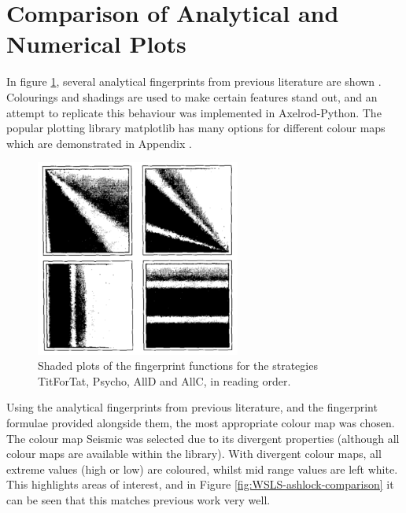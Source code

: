 \section{Comparison of Analytical and Numerical Plots}

In figure \ref{fig:ashlock-fingerprints}, several analytical fingerprints from previous literature are shown \cite{Ashlock2004}.
Colourings and shadings are used to make certain features stand out, and an attempt to replicate this behaviour was implemented in Axelrod-Python.
The popular plotting library matplotlib has many options for different colour maps which are demonstrated in Appendix . %

\begin{figure}[hbtp!]
    \begin{center}
        \includegraphics[width = 0.6\textwidth]{../img/MultipleFingerprintsAshlock}
    \end{center}
    \caption{Shaded plots of the fingerprint functions for the strategies TitForTat, Psycho, AllD and AllC, in reading order.}
    \label{fig:ashlock-fingerprints}
\end{figure}

Using the analytical fingerprints from previous literature, and the fingerprint formulae provided alongside them, the most appropriate colour map was chosen.
The colour map Seismic was selected due to its divergent properties (although all colour maps are available within the library).
With divergent colour maps, all extreme values (high or low) are coloured, whilst mid range values are left white.
This highlights areas of interest, and in Figure \ref{fig:WSLS-ashlock-comparison} it can be seen that this matches previous work very well.

